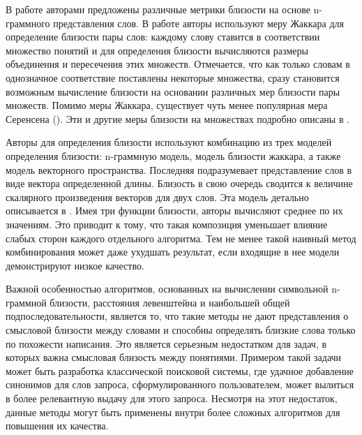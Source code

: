 В работе \cite{ngrams_sim} авторами предложены различные метрики близости на основе n-граммного представления слов. В работе \cite{Albatineh2011} авторы используют  меру Жаккара для определение близости пары слов: каждому слову ставится в соответствии множество понятий и для определения близости вычисляются размеры объединения и пересечения этих множеств. Отмечается, что как только словам в однозначное соответствие поставлены некоторые множества, сразу становится возможным вычисление близости на основании различных мер близости пары множеств. Помимо меры Жаккара, существует чуть менее популярная мера Серенсена (\cite{dice_1}). Эти и другие меры близости на множествах подробно описаны в \cite{dist_between_sets}.

Авторы \cite{Shirude} для определения близости используют комбинацию из трех моделей определения близости: n-граммную модель, модель близости жаккара, а также модель векторного пространства. Последняя подразумевает представление слов в виде вектора определенной длины. Близость в свою очередь сводится к величине скалярного произведения векторов для двух слов. Эта модель детально описывается в \cite{vector_space}. Имея три функции близости, авторы вычисляют среднее по их значениям. Это приводит к тому, что такая композиция уменьшает влияние слабых сторон каждого отдельного алгоритма. Тем не менее такой наивный метод комбинирования может даже ухудшать результат, если входящие в нее модели демонстрируют низкое качество.

Важной особенностью алгоритмов, основанных на вычислении символьной n-граммной близости, расстояния левенштейна и наибольшей общей подпоследовательности, является то, что такие методы не дают представления о смысловой близости между словами и способны определять близкие слова только по похожести написания. Это является серьезным недостатком для задач, в которых важна смысловая близость между понятиями. Примером такой задачи может быть разработка классической поисковой системы, где удачное добавление синонимов для слов запроса, сформулированного пользователем, может вылиться в более релевантную выдачу для этого запроса.  Несмотря на этот недостаток, данные методы могут быть применены внутри более сложных алгоритмов для повышения их качества.

